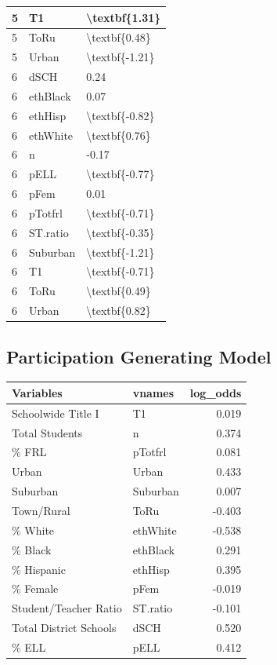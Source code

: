 \documentclass[man,floatsintext]{apa6}
\begin{document}
\begin{table}[H]
\begin{tabular}{l|l|l}
\hline
5 & T1 & \textbackslash{}textbf\{1.31\}\\
\hline
5 & ToRu & \textbackslash{}textbf\{0.48\}\\
\hline
5 & Urban & \textbackslash{}textbf\{-1.21\}\\
\hline
6 & dSCH & 0.24\\
\hline
6 & ethBlack & 0.07\\
\hline
6 & ethHisp & \textbackslash{}textbf\{-0.82\}\\
\hline
6 & ethWhite & \textbackslash{}textbf\{0.76\}\\
\hline
6 & n & -0.17\\
\hline
6 & pELL & \textbackslash{}textbf\{-0.77\}\\
\hline
6 & pFem & 0.01\\
\hline
6 & pTotfrl & \textbackslash{}textbf\{-0.71\}\\
\hline
6 & ST.ratio & \textbackslash{}textbf\{-0.35\}\\
\hline
6 & Suburban & \textbackslash{}textbf\{-1.21\}\\
\hline
6 & T1 & \textbackslash{}textbf\{-0.71\}\\
\hline
6 & ToRu & \textbackslash{}textbf\{0.49\}\\
\hline
6 & Urban & \textbackslash{}textbf\{0.82\}\\
\hline
\end{tabular}
\end{table}

\hypertarget{participation-generating-model}{%
\subsection{Participation Generating Model}\label{participation-generating-model}}

\begin{table}[H]
\centering
\begin{tabular}{l|l|r}
\hline
Variables & vnames & log\_odds\\
\hline
Schoolwide Title I & T1 & 0.019\\
\hline
Total Students & n & 0.374\\
\hline
\% FRL & pTotfrl & 0.081\\
\hline
Urban & Urban & 0.433\\
\hline
Suburban & Suburban & 0.007\\
\hline
Town/Rural & ToRu & -0.403\\
\hline
\% White & ethWhite & -0.538\\
\hline
\% Black & ethBlack & 0.291\\
\hline
\% Hispanic & ethHisp & 0.395\\
\hline
\% Female & pFem & -0.019\\
\hline
Student/Teacher Ratio & ST.ratio & -0.101\\
\hline
Total District Schools & dSCH & 0.520\\
\hline
\% ELL & pELL & 0.412\\
\hline
\end{tabular}
\end{table}
\end{document}
